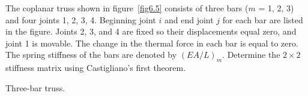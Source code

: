 \documentclass{AeroStructure-ERJohnson}
\begin{document}
\begin{example*}\label{ex6.1}The coplanar truss shown in figure~\ref{fig6.5} consists of three bars ($m$ = 1, 2, 3) and four joints 1, 2, 3, 4. Beginning joint $i$ and end joint $j$ for each bar are listed in the figure. Joints 2, 3, and 4 are fixed so their displacements equal zero, and joint 1 is movable. The change in the thermal force in each bar is equal to zero. The spring stiffness of the bars are denoted by $(E A / L)_{m}$. Determine the $2\times 2$ stiffness matrix using Castigliano's first theorem.

{\caption{Three-bar truss.}\label{fig6.5}}


\end{example*}
\end{document}
